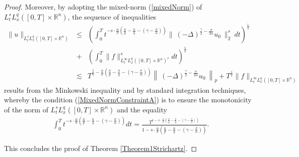 \documentclass{amsart}
\theoremstyle{definition}
\theoremstyle{remark}
\numberwithin{equation}{section}
\newcommand{\BR}{{\mathbb R}}
\begin{document}
\begin{proof}
			Moreover, by adopting the mixed-norm (\ref{mixedNorm}) of $L^s_tL^q_x([0,T]\times\BR^n)$, the sequence of inequalities
			\begin{eqnarray*}
				\|u\|_{L^s_tL^q_x([0,T]\times\BR^n)}&\leq& \left(\int_0^T t^{-s\cdot\frac{\alpha}{\sigma}\left(\frac{n}{p}-\frac{n}{q}-\left(\gamma-\frac{\sigma}{\alpha}\right)\right)} \|~(-\Delta)^{\frac{\gamma}{2}-\frac{\sigma}{2\alpha}}u_0~\|_{2}^s~dt\right)^{\frac{1}{s}} \\
				&+& \left(\int_0^T \|f\|_{L^\infty_tL^q_x([0,T]\times\BR^n)^s}^sdt\right)^{\frac{1}{s}} \\
				&\lesssim& T^{\frac{1}{s}-\frac{\alpha}{\sigma}\left(\frac{n}{p}-\frac{n}{q}-\left(\gamma-\frac{\sigma}{\alpha}\right)\right)} \left\|~(-\Delta)^{\frac{\gamma}{2}-\frac{\sigma}{2\alpha}}u_0~\right\|_{p}+T^{\frac{1}{s}}\|f\|_{L^\infty_tL^q_x([0,T]\times\BR^n)} 
			\end{eqnarray*}
			results from the Minkowski inequality and by standard integration techniques, whereby the condition (\ref{MixedNormConstraintA}) is to ensure the monotonicity of the norm of $L^s_tL^q_x([0,T]\times\BR^n)$ and the equality 
			\begin{eqnarray}
				\label{StrichartzIntegralA}\displaystyle \int_0^T t^{-s\cdot \frac{\alpha}{\sigma}\left(\frac{n}{p}-\frac{n}{q}-\left(\gamma-\frac{\sigma}{\alpha}\right)\right)}dt=\frac{T^{1-s\cdot \frac{\alpha}{\sigma}\left(\frac{n}{p}-\frac{n}{q}-\left(\gamma-\frac{\sigma}{\alpha}\right)\right)}}{1-s\cdot\frac{\alpha}{\sigma}\left(\frac{n}{p}-\frac{n}{q}-\left(\gamma-\frac{\sigma}{\alpha}\right)\right)}.
			\end{eqnarray}
			
			This concludes the proof of Theorem \ref{Theorem1Strichartz}.
		\end{proof}
\end{document}

